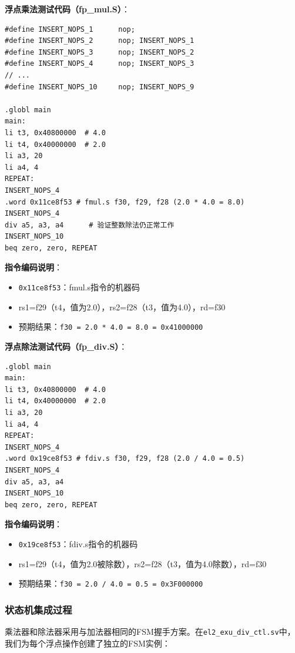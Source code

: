 \documentclass[12pt,a4paper]{article}
\begin{document}
\textbf{浮点乘法测试代码（fp\_mul.S）}：

\begin{lstlisting}[language={[x86masm]Assembler}]
#define INSERT_NOPS_1      nop;
#define INSERT_NOPS_2      nop; INSERT_NOPS_1
#define INSERT_NOPS_3      nop; INSERT_NOPS_2
#define INSERT_NOPS_4      nop; INSERT_NOPS_3
// ...
#define INSERT_NOPS_10     nop; INSERT_NOPS_9

.globl main 
main:
li t3, 0x40800000  # 4.0
li t4, 0x40000000  # 2.0
li a3, 20 
li a4, 4 
REPEAT: 
INSERT_NOPS_4 
.word 0x11ce8f53 # fmul.s f30, f29, f28 (2.0 * 4.0 = 8.0)
INSERT_NOPS_4  
div a5, a3, a4      # 验证整数除法仍正常工作
INSERT_NOPS_10 
beq zero, zero, REPEAT
\end{lstlisting}

\textbf{指令编码说明}：
\begin{itemize}[itemsep=0pt, parsep=3pt]
    \item \texttt{0x11ce8f53}：fmul.s指令的机器码
    \item rs1=f29（t4，值为2.0），rs2=f28（t3，值为4.0），rd=f30
    \item 预期结果：\texttt{f30 = 2.0 * 4.0 = 8.0 = 0x41000000}
\end{itemize}
\clearpage
\textbf{浮点除法测试代码（fp\_div.S）}：

\begin{lstlisting}[language={[x86masm]Assembler}]
.globl main 
main:
li t3, 0x40800000  # 4.0
li t4, 0x40000000  # 2.0
li a3, 20 
li a4, 4 
REPEAT: 
INSERT_NOPS_4 
.word 0x19ce8f53 # fdiv.s f30, f29, f28 (2.0 / 4.0 = 0.5)
INSERT_NOPS_4  
div a5, a3, a4
INSERT_NOPS_10 
beq zero, zero, REPEAT
\end{lstlisting}

\textbf{指令编码说明}：
\begin{itemize}[itemsep=0pt, parsep=3pt]
    \item \texttt{0x19ce8f53}：fdiv.s指令的机器码
    \item rs1=f29（t4，值为2.0被除数），rs2=f28（t3，值为4.0除数），rd=f30
    \item 预期结果：\texttt{f30 = 2.0 / 4.0 = 0.5 = 0x3F000000}
\end{itemize}

\subsubsection{状态机集成过程}

乘法器和除法器采用与加法器相同的FSM握手方案。在\texttt{el2\_exu\_div\_ctl.sv}中，我们为每个浮点操作创建了独立的FSM实例：
\end{document}
